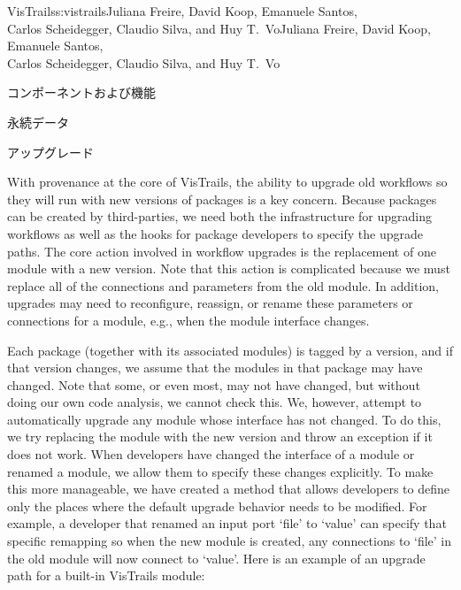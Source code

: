 \begin{aosachaptertoc}{VisTrails}{s:vistrails}{Juliana Freire, David Koop, Emanuele Santos, \\ Carlos Scheidegger, Claudio Silva, and Huy T.\ Vo}{Juliana Freire, David Koop, Emanuele Santos, \\ \hspace*{0.9cm} Carlos Scheidegger, Claudio Silva, and Huy T.\ Vo}
\begin{aosasect1}{コンポーネントおよび機能}
\begin{aosasect2}{永続データ}
\end{aosasect2}

\begin{aosasect2}{アップグレード}
\label{sec.vistrails.upgrades}

With provenance at the core of VisTrails, the ability to upgrade old
workflows so they will run with new versions of packages is a key
concern.  Because packages can be created by third-parties, we need
both the infrastructure for upgrading workflows as well as the hooks
for package developers to specify the upgrade paths.  The core action
involved in workflow upgrades is the replacement of one module with a
new version.  Note that this action is complicated because we must
replace all of the connections and parameters from the old module.  In
addition, upgrades may need to reconfigure, reassign, or rename these
parameters or connections for a module, e.g., when the module
interface changes.

Each package (together with its associated modules) is tagged by a
version, and if that version changes, we assume that the modules in
that package may have changed.  Note that some, or even most, may not
have changed, but without doing our own code analysis, we cannot check
this.  We, however, attempt to automatically upgrade any module
whose interface has not changed.  To do this, we try replacing the
module with the new version and throw an exception if it does not
work.  When developers have changed the interface of a module or
renamed a module, we allow them to specify these changes explicitly.
To make this more manageable, we have created a 
method that allows developers to define only the places where the
default upgrade behavior needs to be modified.  For example, a
developer that renamed an input port `file' to `value' can specify
that specific remapping so when the new module is created, any
connections to `file' in the old module will now connect to
`value'. Here is an example of an upgrade path for a built-in
VisTrails module:


\end{aosasect2}
\end{aosasect1}
\end{aosachaptertoc}
